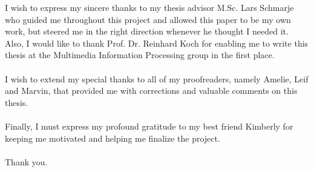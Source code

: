 
\begin{acknowledgements}      

    I wish to express my sincere thanks to my thesis advisor M.Sc. Lars Schmarje who guided me throughout this project and allowed this paper to be my own work, but steered me in the right direction whenever he thought I needed it. Also, I would like to thank Prof. Dr. Reinhard Koch for enabling me to write this thesis at the Multimedia Information Processing group in the first place.\\
    \\I wish to extend my special thanks to all of my proofreaders, namely Amelie, Leif and Marvin, that provided me with corrections and valuable comments on this thesis.\\
    \\Finally, I must express my profound gratitude to my best friend Kimberly for keeping me motivated and helping me finalize the project.\\
    \\Thank you. 


\end{acknowledgements}
